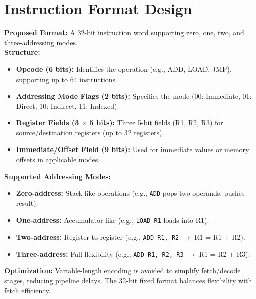 \documentclass[a4paper,12pt]{article}
\begin{document}
\section{Instruction Format Design}
\textbf{Proposed Format:} A 32-bit instruction word supporting zero, one, two, and three-addressing modes. \\
\textbf{Structure:}
\begin{itemize}
    \item \textbf{Opcode (6 bits):} Identifies the operation (e.g., ADD, LOAD, JMP), supporting up to 64 instructions.
    \item \textbf{Addressing Mode Flags (2 bits):} Specifies the mode (00: Immediate, 01: Direct, 10: Indirect, 11: Indexed).
    \item \textbf{Register Fields (3 $\times$ 5 bits):} Three 5-bit fields (R1, R2, R3) for source/destination registers (up to 32 registers).
    \item \textbf{Immediate/Offset Field (9 bits):} Used for immediate values or memory offsets in applicable modes.
\end{itemize}
\textbf{Supported Addressing Modes:}
\begin{itemize}
    \item \textbf{Zero-address:} Stack-like operations (e.g., \texttt{ADD} pops two operands, pushes result).
    \item \textbf{One-address:} Accumulator-like (e.g., \texttt{LOAD R1} loads into R1).
    \item \textbf{Two-address:} Register-to-register (e.g., \texttt{ADD R1, R2} $\rightarrow$ R1 = R1 + R2).
    \item \textbf{Three-address:} Full flexibility (e.g., \texttt{ADD R1, R2, R3} $\rightarrow$ R1 = R2 + R3).
\end{itemize}
\textbf{Optimization:} Variable-length encoding is avoided to simplify fetch/decode stages, reducing pipeline delays. The 32-bit fixed format balances flexibility with fetch efficiency.
\end{document}
